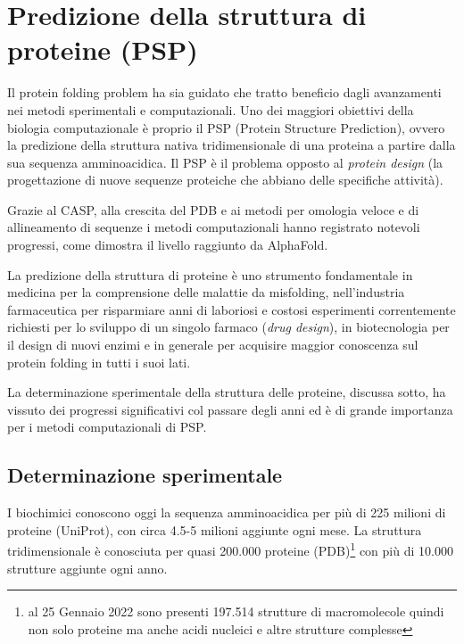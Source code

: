 \chapter{Predizione della struttura di proteine (PSP)}

Il protein folding problem ha sia guidato che tratto beneficio dagli avanzamenti nei metodi sperimentali e computazionali\supercite{dill2008protein}. Uno dei maggiori obiettivi della biologia computazionale è proprio il PSP (Protein Structure Prediction), ovvero la predizione della struttura nativa tridimensionale di una proteina a partire dalla sua sequenza amminoacidica. Il PSP è il problema opposto al \textit{protein design} (la progettazione di nuove sequenze proteiche che abbiano delle specifiche attività).

\par Grazie al CASP, alla crescita del PDB e ai metodi per omologia veloce e di allineamento di sequenze i metodi computazionali hanno registrato notevoli progressi, come dimostra il livello raggiunto da AlphaFold. 

\par La predizione della struttura di proteine è uno strumento fondamentale in medicina per la comprensione delle malattie da misfolding, nell'industria farmaceutica per risparmiare anni di laboriosi e costosi esperimenti correntemente richiesti per lo sviluppo di un singolo farmaco (\textit{drug design}), in biotecnologia per il design di nuovi enzimi e in generale per acquisire maggior conoscenza sul protein folding in tutti i suoi lati.

\par La determinazione sperimentale della struttura delle proteine, discussa sotto, ha vissuto dei progressi significativi col passare degli anni ed è di grande importanza per i metodi computazionali di PSP.

\section{Determinazione sperimentale}

I biochimici conoscono oggi la sequenza amminoacidica per più di 225 milioni di proteine\supercite{proteienDBentries} (UniProt), con circa 4.5-5 milioni aggiunte ogni mese. La struttura tridimensionale è conosciuta per quasi 200.000 proteine\supercite{proteienDBentries} (PDB)\footnote{al 25 Gennaio 2022 sono presenti 197.514 strutture di macromolecole quindi non solo proteine ma anche acidi nucleici e altre strutture complesse\supercite{pdbStats}} con più di 10.000 strutture aggiunte ogni anno. 

